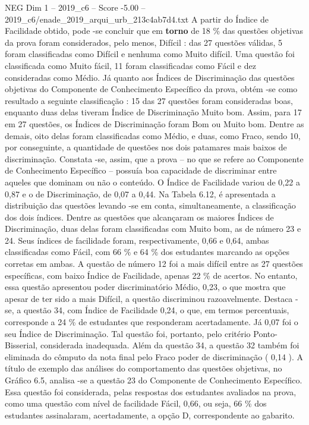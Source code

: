 \begin{textsample}{NEG Dim 1 – 2019\_c6 – Score -5.00 – 2019\_c6/enade\_2019\_arqui\_urb\_213c4ab7d4.txt}
A partir do Índice de Facilidade obtido, pode -se concluir que em \textbf{torno} de 18 \% das questões objetivas da prova foram considerados, pelo menos, Difícil : das 27 questões válidas, 5 foram classificadas como Difícil e nenhuma como Muito difícil.
Uma questão foi classificada como Muito fácil, 11 foram classificadas como Fácil e dez consideradas como Médio.
Já quanto aos Índices de Discriminação das questões objetivas do Componente de Conhecimento Específico da prova, obtém -se como resultado a seguinte classificação : 15 das 27 questões foram consideradas boas, enquanto duas delas tiveram Índice de Discriminação Muito bom.
Assim, para 17 em 27 questões, os Índices de Discriminação foram Bom ou Muito bom.
Dentre as demais, oito delas foram classificadas como Médio, e duas, como Fraco, sendo 10, por conseguinte, a quantidade de questões nos dois patamares mais baixos de discriminação.
Constata -se, assim, que a prova – no que se refere ao Componente de Conhecimento Específico – possuía boa capacidade de discriminar entre aqueles que dominam ou não o conteúdo.
O Índice de Facilidade variou de 0,22 a 0,87 e o de Discriminação, de 0,07 a 0,44.
Na Tabela 6.12, é apresentada a distribuição das questões levando -se em conta, simultaneamente, a classificação dos dois índices.
Dentre as questões que alcançaram os maiores Índices de Discriminação, duas delas foram classificadas com Muito bom, as de número 23 e 24.
Seus índices de facilidade foram, respectivamente, 0,66 e 0,64, ambas classificadas como Fácil, com 66 \% e 64 \% dos estudantes marcando as opções corretas em ambas.
A questão de número 12 foi a mais difícil entre as 27 questões específicas, com baixo Índice de Facilidade, apenas 22 \% de acertos.
No entanto, essa questão apresentou poder discriminatório Médio, 0,23, o que mostra que apesar de ter sido a mais Difícil, a questão discriminou razoavelmente.
Destaca -se, a questão 34, com Índice de Facilidade 0,24, o que, em termos percentuais, corresponde a 24 \% de estudantes que responderam acertadamente.
Já 0,07 foi o seu Índice de Discriminação.
Tal questão foi, portanto, pelo critério Ponto-Bisserial, considerada inadequada.
Além da questão 34, a questão 32 também foi eliminada do cômputo da nota final pelo Fraco poder de discriminação ( 0,14 ).
A título de exemplo das análises do comportamento das questões objetivas, no Gráfico 6.5, analisa -se a questão 23 do Componente de Conhecimento Específico.
Essa questão foi considerada, pelas respostas dos estudantes avaliados na prova, como uma questão com nível de facilidade Fácil, 0,66, ou seja, 66 \% dos estudantes assinalaram, acertadamente, a opção D, correspondente ao gabarito.

\end{textsample}
